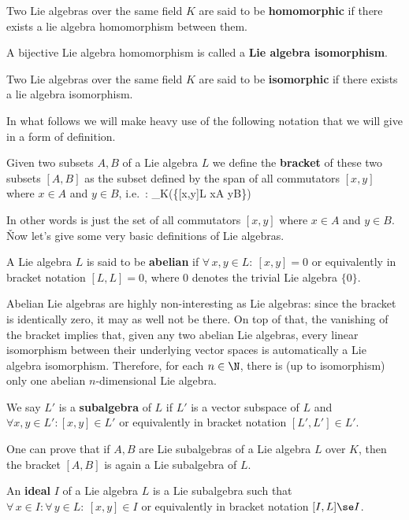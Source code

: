 Two Lie algebras over the same field $K$ are said to be \textbf{homomorphic} if there exists a lie algebra
homomorphism between them.
\ed

A bijective Lie algebra homomorphism is called a \textbf{Lie algebra isomorphism}.
\ed

Two Lie algebras over the same field $K$ are said to be \textbf{isomorphic} if there exists a lie algebra isomorphism.
\ed

In what follows we will make heavy use of the following notation that we will give in a form of definition.

\bd [Bracket]
Given two subsets $A,B$ of a Lie algebra $L$ we define the \textbf{bracket} of these two subsets $[A,B]$ as the
subset defined by the span of all commutators $[x,y]$ where $x\in A$ and $y\in B$, i.e.\ :
\bse
[A,B] \coloneqq \lspan_K\bigl(\{[x,y]\in L \mid x\in A  y\in B\}\bigr)
\ese
\ed

In other words is just the set of all commutators $[x,y]$ where $x \in A$ and $y \in B$. \v

Now let's give some very basic definitions of Lie algebras.

A Lie algebra $L$ is said to be \textbf{abelian} if $\forall \, x,y \in L : \ [x,y] = 0$ or equivalently in bracket
notation $[L,L]=0$, where $0$ denotes the trivial Lie algebra $\{0\}$.
\ed

Abelian Lie algebras are highly non-interesting as Lie algebras: since the bracket is identically zero, it may as
well not be there. On top of that, the vanishing of the bracket implies that, given any two abelian Lie algebras,
every linear isomorphism between their underlying vector spaces is automatically a Lie algebra isomorphism.
Therefore, for each $n\in \N$, there is (up to isomorphism) only one abelian $n$-dimensional Lie algebra.

\bd [Subalgebra]
We say $L'$ is a \textbf{subalgebra} of $L$ if $L'$ is a vector subspace of $L$ and $\forall x,y \in L': [x,y] \in
L'$ or equivalently in bracket notation $[L',L'] \in L'$.
\ed

One can prove that if $A,B$ are Lie subalgebras of a Lie algebra $L$ over $K$, then the bracket $[A,B]$ is again a
Lie subalgebra of $L$.

\bd [Ideal]
An \textbf{ideal} $I$ of a Lie algebra $L$ is a Lie subalgebra such that $\forall \, x\in I : \forall \, y\in L : \
[x,y]\in I$ or equivalently in bracket notation $[I,L]\se I$.
\ed

